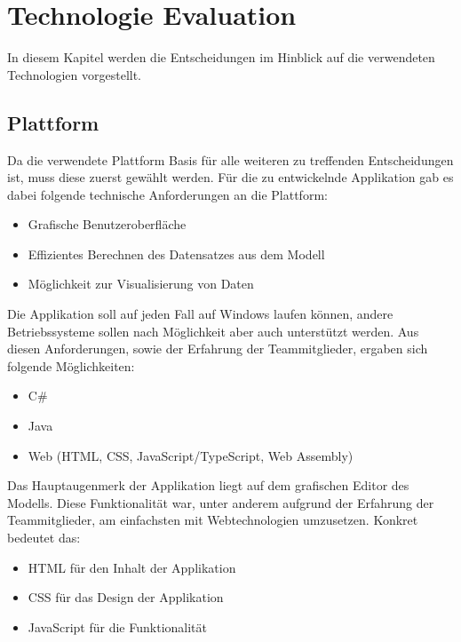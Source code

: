 
\chapter{Technologie Evaluation}

In diesem Kapitel werden die Entscheidungen im Hinblick auf die verwendeten Technologien vorgestellt.

\section{Plattform}

Da die verwendete Plattform Basis für alle weiteren zu treffenden Entscheidungen ist, muss diese zuerst gewählt werden. Für die zu entwickelnde Applikation gab es dabei folgende technische Anforderungen an die Plattform:

\begin{itemize}
    \item Grafische Benutzeroberfläche
    \item Effizientes Berechnen des Datensatzes aus dem Modell
    \item Möglichkeit zur Visualisierung von Daten
\end{itemize}

Die Applikation soll auf jeden Fall auf Windows laufen können, andere Betriebssysteme sollen nach Möglichkeit aber auch unterstützt werden. Aus diesen Anforderungen, sowie der Erfahrung der Teammitglieder, ergaben sich folgende Möglichkeiten:
\begin{itemize}
    \item C\#
    \item Java
    \item Web (HTML, CSS, JavaScript/TypeScript, Web Assembly)
\end{itemize}

Das Hauptaugenmerk der Applikation liegt auf dem grafischen Editor des Modells. Diese Funktionalität war, unter anderem aufgrund der Erfahrung der Teammitglieder, am einfachsten mit Webtechnologien umzusetzen. Konkret bedeutet das:
\begin{itemize}
    \item HTML für den Inhalt der Applikation
    \item CSS für das Design der Applikation
    \item JavaScript für die Funktionalität
\end{itemize}

